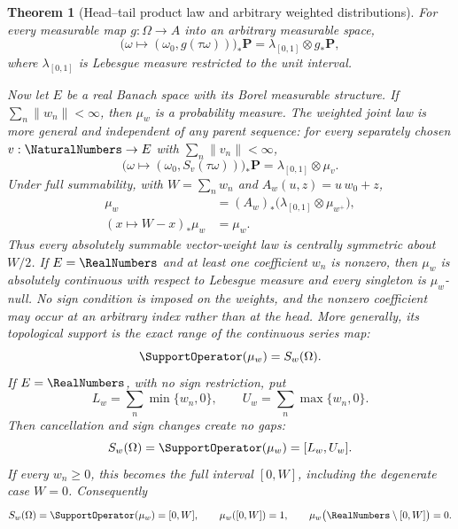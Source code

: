 \documentclass[11pt,oneside]{article}
\newtheorem{theorem}{Theorem}[section]
\theoremstyle{definition}
\theoremstyle{remark}
\begin{document}
\begin{theorem}[Head--tail product law and arbitrary weighted distributions]
\label{thm:generic-weighted-law}
For every measurable map \(g:\Omega\to A\) into an arbitrary measurable space,
\begin{equation}
 \bigl(\omega\mapsto(\omega_0,g(\tau\omega))\bigr)_*\mathbf P
 =\lambda_{[0,1]}\otimes g_*\mathbf P,                       \label{eq:generic-head-tail-map}
\end{equation}
where \(\lambda_{[0,1]}\) is Lebesgue measure restricted to the unit interval.

Now let \(E\) be a real Banach space with its Borel measurable structure.  If
\(\sum_n\lVert w_n\rVert<\infty\), then \(\mu_w\) is a probability measure.  The
weighted joint law is more general and independent of any parent sequence: for every separately chosen
\(v:\NaturalNumbers\to E\) with \(\sum_n\lVert v_n\rVert<\infty\),
\begin{equation}
 \bigl(\omega\mapsto(\omega_0,S_v(\tau\omega))\bigr)_*\mathbf P
 =\lambda_{[0,1]}\otimes\mu_v.                               \label{eq:weighted-head-tail-map}
\end{equation}
Under full summability, with \(W=\sum_n w_n\) and
\(A_w(u,z)=u\,w_0+z\),
\begin{align}
 \mu_w&=(A_w)_*\bigl(\lambda_{[0,1]}\otimes\mu_{w^+}\bigr),  \label{eq:weighted-law-split}\\
 (x\mapsto W-x)_*\mu_w&=\mu_w.                              \label{eq:weighted-law-reflection}
\end{align}
Thus every absolutely summable vector-weight law is centrally symmetric about \(W/2\).
If \(E=\RealNumbers\) and at least one coefficient \(w_n\) is nonzero, then \(\mu_w\) is absolutely
continuous with respect to Lebesgue measure and every singleton is \(\mu_w\)-null.  No sign
condition is imposed on the weights, and the nonzero coefficient may occur at an arbitrary
index rather than at the head.
More generally, its topological support is the exact range of the continuous series map:
\begin{equation}
 \SupportOperator(\mu_w)=S_w(\Omega).                                   \label{eq:weighted-law-support-range}
\end{equation}
If \(E=\RealNumbers\), with no sign restriction, put
\[
 L_w=\sum_n\min\{w_n,0\},\qquad U_w=\sum_n\max\{w_n,0\}.
\]
Then cancellation and sign changes create no gaps:
\begin{equation}
 S_w(\Omega)=\SupportOperator(\mu_w)=[L_w,U_w].                         \label{eq:weighted-law-signed-support}
\end{equation}
If every \(w_n\ge0\), this becomes the full interval \([0,W]\), including the degenerate
case \(W=0\).  Consequently
\begin{equation}
 S_w(\Omega)=\SupportOperator(\mu_w)=[0,W],\qquad
 \mu_w([0,W])=1,\qquad \mu_w\bigl(\RealNumbers\setminus[0,W]\bigr)=0.  \label{eq:weighted-law-support}
\end{equation}
\end{theorem}
\end{document}
